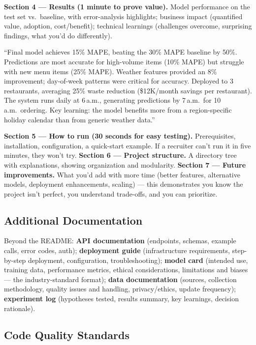 \textbf{Section 4 --- Results (1 minute to prove value).} Model performance on the test set vs.\ baseline, with
error-analysis highlights; business impact (quantified value, adoption, cost/benefit); technical learnings
(challenges overcome, surprising findings, what you'd do differently).

\begin{example}
``Final model achieves 15\% MAPE, beating the 30\% MAPE baseline by 50\%. Predictions are most accurate for
high-volume items (10\% MAPE) but struggle with new menu items (25\% MAPE). Weather features provided an 8\%
improvement; day-of-week patterns were critical for accuracy. Deployed to 3 restaurants, averaging 25\% waste
reduction (\$12K/month savings per restaurant). The system runs daily at 6\,a.m., generating predictions by
7\,a.m.\ for 10\,a.m.\ ordering. Key learning: the model benefits more from a region-specific holiday calendar
than from generic weather data.''
\end{example}

\textbf{Section 5 --- How to run (30 seconds for easy testing).} Prerequisites, installation, configuration, a
quick-start example. If a recruiter can't run it in five minutes, they won't try. \textbf{Section 6 --- Project
structure.} A directory tree with explanations, showing organization and modularity. \textbf{Section 7 --- Future
improvements.} What you'd add with more time (better features, alternative models, deployment enhancements,
scaling) --- this demonstrates you know the project isn't perfect, you understand trade-offs, and you can
prioritize.

\subsection{Additional Documentation}

Beyond the README: \textbf{API documentation} (endpoints, schemas, example calls, error codes, auth);
\textbf{deployment guide} (infrastructure requirements, step-by-step deployment, configuration,
troubleshooting); \textbf{model card} (intended use, training data, performance metrics, ethical considerations,
limitations and biases --- the industry-standard format); \textbf{data documentation} (sources, collection
methodology, quality issues and handling, privacy/ethics, update frequency); \textbf{experiment log} (hypotheses
tested, results summary, key learnings, decision rationale).

\subsection{Code Quality Standards}

